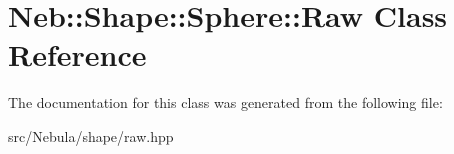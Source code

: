 \hypertarget{classNeb_1_1Shape_1_1Sphere_1_1Raw}{\section{\-Neb\-:\-:\-Shape\-:\-:\-Sphere\-:\-:\-Raw \-Class \-Reference}
\label{classNeb_1_1Shape_1_1Sphere_1_1Raw}
}


\-The documentation for this class was generated from the following file\-:\begin{DoxyCompactItemize}
\item 
src/\-Nebula/shape/raw.\-hpp\end{DoxyCompactItemize}
